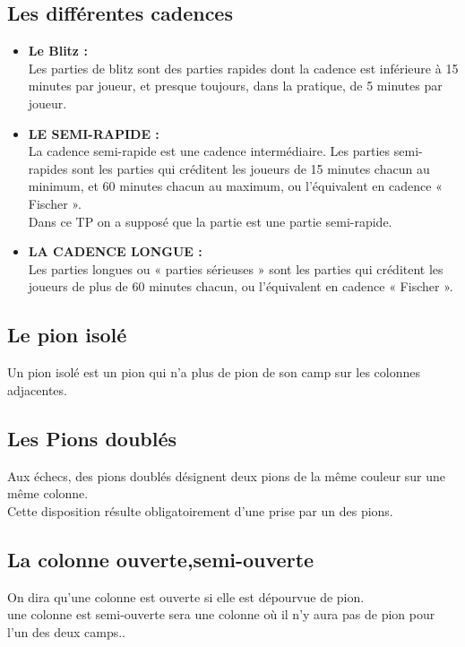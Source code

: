 \documentclass[12pt]{report}
\begin{document}
	\subsection{Les différentes cadences}
	\begin{itemize}
		\item	\textbf{Le Blitz :}\\
	Les parties de blitz sont des parties rapides dont la cadence est inférieure à 15 minutes par joueur, et presque toujours, dans la pratique, de 5 minutes par joueur.
	
	\item \textbf{LE SEMI-RAPIDE :}\\
	La cadence semi-rapide est une cadence intermédiaire. Les parties semi-rapides sont les parties qui créditent les joueurs de 15 minutes chacun au minimum, et 60 minutes chacun au maximum, ou l’équivalent en cadence « Fischer ».\\
	
	Dans ce TP on a supposé que la partie est une partie semi-rapide.
	
	\item \textbf{LA CADENCE LONGUE :}\\
	Les parties longues ou « parties sérieuses » sont les parties qui créditent les joueurs de plus de 60 minutes chacun, ou l’équivalent en cadence « Fischer ».
\end{itemize}
	
	\subsection{Le pion isolé}
		Un pion isolé est un pion qui n'a plus de pion de son camp sur les colonnes adjacentes. 
	\subsection{Les Pions doublés}
		Aux échecs, des pions doublés désignent deux pions de la même couleur sur une même colonne.\\
		
		Cette disposition résulte obligatoirement d'une prise par un des pions.
	\subsection{La colonne ouverte,semi-ouverte}
		On dira qu'une colonne est ouverte si elle est dépourvue de pion.\\
		une colonne est semi-ouverte sera une colonne où il n'y aura pas de pion pour l'un des deux camps..
\end{document}
